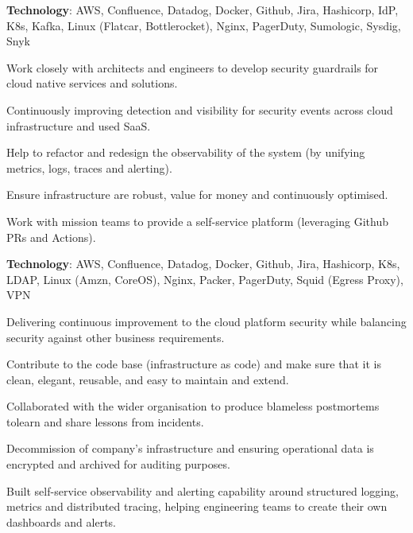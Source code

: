 \sectionsep
\textbf{Technology}: AWS, Confluence, Datadog, Docker, Github, Jira, Hashicorp, IdP, K8s, Kafka, Linux (Flatcar, Bottlerocket), Nginx, PagerDuty, Sumologic, Sysdig, Snyk
\sectionsep
\begin{tightemize}
\item Work closely with architects and engineers to develop security guardrails for cloud native services and solutions.
\item Continuously improving detection and visibility for security events across cloud infrastructure and used SaaS.
\item Help to refactor and redesign the observability of the system (by unifying metrics, logs, traces and alerting).
\item Ensure infrastructure are robust, value for money and continuously optimised.
\item Work with mission teams to provide a self-service platform (leveraging Github PRs and Actions).
\end{tightemize}
\sectionsep
\sectionsep
{}
\sectionsep
\textbf{Technology}: AWS, Confluence, Datadog, Docker, Github, Jira, Hashicorp, K8s, LDAP, Linux (Amzn, CoreOS), Nginx, Packer, PagerDuty, Squid (Egress Proxy), VPN
\sectionsep
\begin{tightemize}
\item Delivering continuous improvement to the cloud platform security while balancing security against other business requirements.
\item Contribute to the code base (infrastructure as code) and make sure that it is clean, elegant, reusable, and easy to maintain and extend.
\item Collaborated with the wider organisation to produce blameless postmortems tolearn and share lessons from incidents.
\item Decommission of company's infrastructure and ensuring operational data is encrypted and archived for auditing purposes.
\item Built self-service observability and alerting capability around structured logging, metrics and distributed tracing, helping engineering teams to create their own dashboards and alerts.
\end{tightemize}
\sectionsep
\sectionsep
{}
